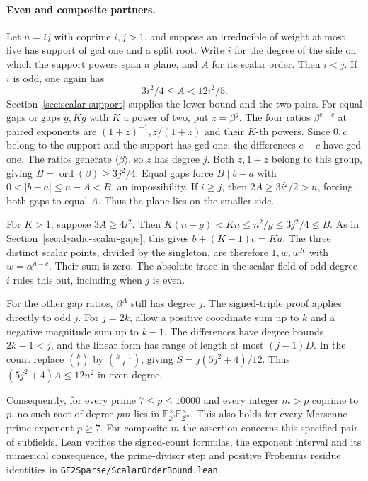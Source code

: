 \documentclass[11pt]{article}
\newcommand{\ord}{\operatorname{ord}}
\begin{document}
\paragraph{Even and composite partners.}
Let \(n=ij\) with coprime \(i,j>1\), and suppose an irreducible of
weight at most five has support of gcd one and a split root.
Write \(i\) for the degree of the side on which the support powers
span a plane, and \(A\) for its scalar order. Then \(i<j\).
If \(i\) is odd, one again has
\[
                       3i^2/4\le A<12i^2/5 .
\]
Section~\ref{sec:scalar-support} supplies the lower bound and the two
pairs. For equal gaps or gaps \(g,Kg\) with \(K\) a power of two, put
\(z=\beta^g\). The four ratios \(\beta^{e-c}\) at paired exponents
are \((1+z)^{-1},z/(1+z)\) and their \(K\)-th powers.
Since \(0,c\) belong to the support and the support has gcd one, the
differences \(e-c\) have gcd one. The ratios generate
\(\langle\beta\rangle\), so \(z\) has degree \(j\). Both \(z,1+z\)
belong to this group, giving \(B=\ord(\beta)\ge3j^2/4\). Equal
gaps force \(B\mid b-a\) with \(0<|b-a|\le n-A<B\), an impossibility.
If \(i\ge j\), then \(2A\ge3i^2/2>n\), forcing both gaps to equal
\(A\). Thus the plane lies on the smaller side.

For \(K>1\), suppose \(3A\ge4i^2\). Then
\(K(n-g)<Kn\le n^2/g\le3j^2/4\le B\).
As in Section~\ref{sec:dyadic-scalar-gaps}, this gives
\(b+(K-1)c=Ka\). The three distinct scalar points, divided by the
singleton, are therefore \(1,w,w^K\) with \(w=\alpha^{a-c}\).
Their sum is zero. The absolute trace in the scalar field of odd
degree \(i\) rules this out, including when \(j\) is even.

For the other gap ratios, \(\beta^A\) still has degree \(j\).
The signed-triple proof applies directly to odd \(j\). For \(j=2k\),
allow a positive coordinate sum up to \(k\) and a negative magnitude
sum up to \(k-1\). The differences have degree bounds \(2k-1<j\),
and the linear form has range of length at most \((j-1)D\). In the
count replace \(\binom kt\) by \(\binom{k-1}t\), giving
\(S=j(5j^2+4)/12\). Thus \((5j^2+4)A\le12n^2\) in even degree.

Consequently, for every prime \(7\le p\le10000\) and every integer
\(m>p\) coprime to \(p\), no such root of degree \(pm\) lies in
\(\mathbb F_{2^p}^{\times}\mathbb F_{2^m}^{\times}\).
This also holds for every Mersenne prime exponent \(p\ge7\).
For composite \(m\) the assertion concerns this specified pair of
subfields. Lean verifies the signed-count formulas, the exponent
interval and its numerical consequence, the prime-divisor step and
positive Frobenius residue identities in
\nolinkurl{GF2Sparse/ScalarOrderBound.lean}.
\end{document}
